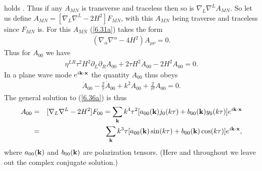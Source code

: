 %
holds  \cite{mannheim_2012}. Thus if any $A_{MN}$ is transverse and traceless then so is $\nabla_{L}\nabla^{L}A_{MN}$. So let us define $A_{MN}=[\nabla_{L}\nabla^{L}-2H^2]F_{MN}$, with this $A_{MN}$ being traverse and traceless since $F_{MN}$ is. For this $A_{MN}$ (\ref{6.31a}) takes the form
%
\begin{eqnarray}
(\nabla_{\alpha}\nabla^{\alpha}-4H^2)A_{\mu\nu}=0.
\label{6.35a}
\end{eqnarray}
%
Thus for $A_{00}$ we have
%
\begin{eqnarray}
\eta^{LR}\tau^2 H^2\partial_{L}\partial_{R}A_{00}+2\tau H^2\dot{A}_{00}
-2H^2A_{00}=0.
\label{6.36a}
\end{eqnarray}
% 
In a plane wave mode $e^{i{\bf k}\cdot{\bf x}}$ the quantity $A_{00}$ thus obeys
%
\begin{eqnarray}
\ddot{A}_{00}-\frac{2}{\tau}\dot{A}_{00}+k^2A_{00}+\frac{2}{\tau^2}A_{00}=0.
\label{6.37a}
\end{eqnarray}
% 
The general solution to (\ref{6.36a}) is thus
%
\begin{eqnarray}
A_{00}&=&[\nabla_{L}\nabla^{L}-2H^2]F_{00}=\sum_{\bf k} k^4\tau^2[a_{00}({\bf k})j_0(k\tau)+b_{00} ({\bf k})y_0(k\tau)]e^{i{\bf k}\cdot {\bf x}}
\nonumber\\
&=&\sum_{\bf k} k^3\tau[a_{00}({\bf k})\sin(k\tau)+b_{00} ({\bf k})\cos(k\tau)]e^{i{\bf k}\cdot {\bf x}},
\label{6.38a}
\end{eqnarray}
% 
where $a_{00}({\bf k})$ and $b_{00}({\bf k})$ are polarization tensors. (Here and throughout we leave out the complex conjugate solution.)

